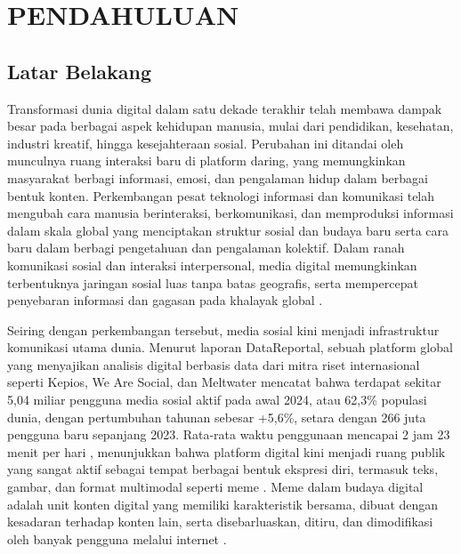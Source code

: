 ﻿\newpage
\pagestyle{fancy}
\fancyhf{}
\fancyhead[R]{\thepage}
\chapter{PENDAHULUAN} \label{Bab I}

\section{Latar Belakang} \label{I.Latar Belakang}
Transformasi dunia digital dalam satu dekade terakhir telah membawa dampak besar pada berbagai aspek kehidupan manusia, mulai dari pendidikan, kesehatan, industri kreatif, hingga kesejahteraan sosial. Perubahan ini ditandai oleh munculnya ruang interaksi baru di platform daring, yang memungkinkan masyarakat berbagi informasi, emosi, dan pengalaman hidup dalam berbagai bentuk konten. Perkembangan pesat teknologi informasi dan komunikasi telah mengubah cara manusia berinteraksi, berkomunikasi, dan memproduksi informasi dalam skala global yang menciptakan struktur sosial dan budaya baru serta cara baru dalam berbagi pengetahuan dan pengalaman kolektif. Dalam ranah komunikasi sosial dan interaksi interpersonal, media digital memungkinkan terbentuknya jaringan sosial luas tanpa batas geografis, serta mempercepat penyebaran informasi dan gagasan pada khalayak global \cite{SyakhraniWidijatmoko2024}. 

Seiring dengan perkembangan tersebut, media sosial kini menjadi infrastruktur komunikasi utama dunia. Menurut laporan DataReportal, sebuah platform global yang menyajikan analisis digital berbasis data dari mitra riset internasional seperti Kepios, We Are Social, dan Meltwater mencatat bahwa terdapat sekitar 5,04 miliar pengguna media sosial aktif pada awal 2024, atau 62,3\% populasi dunia, dengan pertumbuhan tahunan sebesar +5,6\%, setara dengan 266 juta pengguna baru sepanjang 2023. Rata-rata waktu penggunaan mencapai 2 jam 23 menit per hari , menunjukkan bahwa platform digital kini menjadi ruang publik yang sangat aktif sebagai tempat berbagai bentuk ekspresi diri, termasuk teks, gambar, dan format multimodal seperti meme \cite{datareportal2024_global}\cite {datareportal2024_5billion}. Meme dalam budaya digital adalah unit konten digital yang memiliki karakteristik bersama, dibuat dengan kesadaran terhadap konten lain, serta disebarluaskan, ditiru, dan dimodifikasi oleh banyak pengguna melalui internet \cite{shifman2013memes}. 

